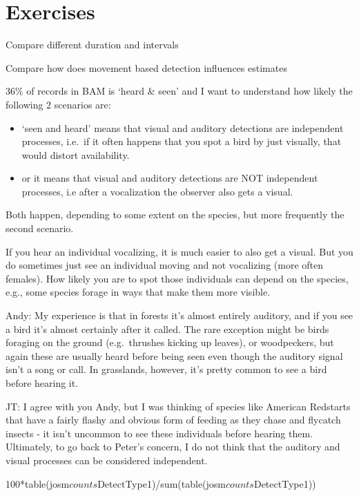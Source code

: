 \documentclass[12pt,]{book}
\providecommand{\tightlist}{%
  \setlength{\itemsep}{0pt}\setlength{\parskip}{0pt}}
\begin{document}
\hypertarget{exercises}{%
\section{Exercises}\label{exercises}}

Compare different duration and intervals

Compare how does movement based detection influences estimates

36\% of records in BAM is `heard \& seen' and I want to understand how likely the following 2 scenarios are:

\begin{itemize}
\tightlist
\item
  `seen and heard' means that visual and auditory detections are independent processes, i.e.~if it often happens that you spot a bird by just visually, that would distort availability.
\item
  or it means that visual and auditory detections are NOT independent processes, i.e after a vocalization the observer also gets a visual.
\end{itemize}

Both happen, depending to some extent on the species, but more frequently the second scenario.

If you hear an individual vocalizing, it is much easier to also get a visual. But you do sometimes just see an individual moving and not vocalizing (more often females). How likely you are to spot those individuals can depend on the species, e.g., some species forage in ways that make them more visible.

Andy: My experience is that in forests it's almost entirely auditory, and if you see a bird it's almost certainly after it called. The rare exception might be birds foraging on the ground (e.g.~thrushes kicking up leaves), or woodpeckers, but again these are usually heard before being seen even though the auditory signal isn't a song or call. In grasslands, however, it's pretty common to see a bird before hearing it.

JT: I agree with you Andy, but I was thinking of species like American Redstarts that have a fairly flashy and obvious form of feeding as they chase and flycatch insects - it isn't uncommon to see these individuals before hearing them. Ultimately, to go back to Peter's concern, I do not think that the auditory and visual processes can be considered independent.

100*table(josm\(counts\)DetectType1)/sum(table(josm\(counts\)DetectType1))
\end{document}
